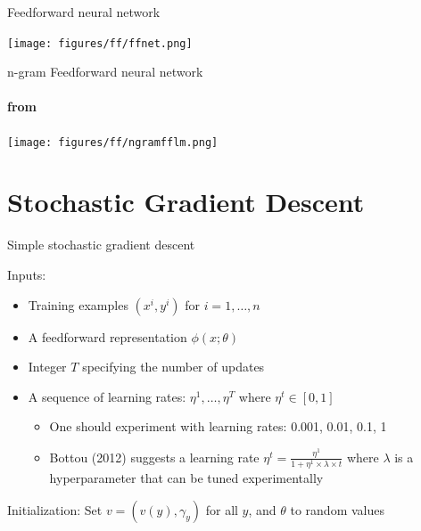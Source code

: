 \begin{frame}{Feedforward neural network}
\begin{block}{}
\centering
\texttt{[image: figures/ff/ffnet.png]}
\end{block}
\end{frame}

\begin{frame}{n-gram Feedforward neural network}
\framesubtitle{from \cite{Bengio2003}}
\begin{block}{}
\centering
\texttt{[image: figures/ff/ngramfflm.png]}
\end{block}
\end{frame}

\section{Stochastic Gradient Descent}
\frame{\tableofcontents[currentsection]}

\begin{frame}{Simple stochastic gradient descent}
\begin{block}{Inputs:}
\begin{itemize}[<+->]
\item Training examples $(x^i, y^i)$ for $i = 1, \ldots, n$
\item A feedforward representation $\phi(x; \theta)$
\item Integer $T$ specifying the number of updates
\item A sequence of learning rates: $\eta^1, \ldots, \eta^T$ where $\eta^t \in [0,1]$
\begin{itemize}[<+->]
\item One should experiment with learning rates: 0.001, 0.01, 0.1, 1
\item Bottou (2012) suggests a learning rate $\eta^t = \frac{\eta^1}{1 + \eta^1 \times \lambda \times t}$ where $\lambda$ is a hyperparameter that can be tuned experimentally
\end{itemize}
\end{itemize}
\end{block}
\pause
\begin{block}{Initialization:}
Set $v = (v(y), \gamma_y)$ for all $y$, and $\theta$ to random values
\end{block}
\end{frame}



